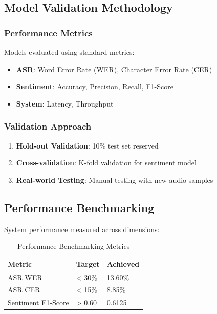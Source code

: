 \documentclass[12pt,a4paper]{report}
\begin{document}
\subsection{Model Validation Methodology}
\subsubsection{Performance Metrics}
Models evaluated using standard metrics:

\begin{itemize}
    \item \textbf{ASR}: Word Error Rate (WER), Character Error Rate (CER)
    \item \textbf{Sentiment}: Accuracy, Precision, Recall, F1-Score
    \item \textbf{System}: Latency, Throughput
\end{itemize}

\subsubsection{Validation Approach}
\begin{enumerate}
    \item \textbf{Hold-out Validation}: 10\% test set reserved
    \item \textbf{Cross-validation}: K-fold validation for sentiment model
    \item \textbf{Real-world Testing}: Manual testing with new audio samples
\end{enumerate}

\subsection{Performance Benchmarking}
System performance measured across dimensions:

\begin{table}[H]
\centering
\caption{Performance Benchmarking Metrics}
\label{tab:performance_metrics}
\begin{tabular}{@{}lll@{}}
\toprule
\textbf{Metric} & \textbf{Target} & \textbf{Achieved} \\ \midrule
ASR WER & < 30\% & 13.60\% \\
ASR CER & < 15\% & 8.85\% \\
Sentiment F1-Score & > 0.60 & 0.6125 \\ \bottomrule
\end{tabular}
\end{table}
\end{document}
